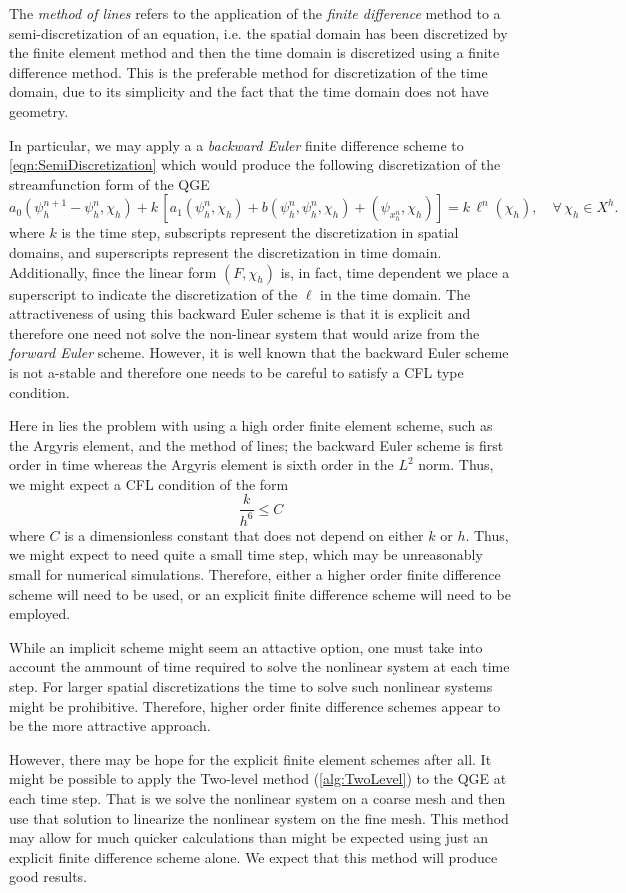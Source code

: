 The \emph{method of lines} refers to the application of the \emph{finite
difference} method to a semi-discretization of an equation, i.e. the spatial
domain has been discretized by the finite element method and then the time
domain is discretized using a finite difference method. This is the preferable
method for discretization of the time domain, due to its simplicity and the fact
that the time domain does not have geometry.

In particular, we may apply a a \emph{backward Euler} finite difference scheme
to \eqref{eqn:SemiDiscretization} which would produce the following
discretization of the streamfunction form of the QGE
\begin{equation}
  a_0(\psi_h^{n+1} - \psi_h^n, \chi_h) + k\, \left[a_1(\psi_h^n,\chi_h) + b(\psi_h^n,\psi_h^n,\chi_h)
      + (\psi_x_h^n,\chi_h)\right] = k\, \ell^n(\chi_h),\quad \forall \, \chi_h \in X^h.
  \label{eqn:BEQGE}
\end{equation}
where $k$ is the time step, subscripts represent the discretization in spatial
domains, and superscripts represent the discretization in time domain.
Additionally, fince the linear form $(F,\chi_h)$ is, in fact, time dependent
we place a superscript to indicate the discretization of the $\ell$ in the time
domain.  The attractiveness of using this backward Euler scheme is that it is
explicit and therefore one need not solve the non-linear system that would arize
from the \emph{forward Euler} scheme. However, it is well known that the
backward Euler scheme is not a-stable and therefore one needs to be careful to
satisfy a CFL type condition.

Here in lies the problem with using a high order finite element scheme, such as
the Argyris element, and the method of lines; the backward Euler scheme is first
order in time whereas the Argyris element is sixth order in the $L^2$ norm.
Thus, we might expect a CFL condition of the form
\begin{equation*}
  \frac{k}{h^6} \le C
\end{equation*}
where $C$ is a dimensionless constant that does not depend on either $k$ or $h$.
Thus, we might expect to need quite a small time step, which may be unreasonably
small for numerical simulations.  Therefore, either a higher order finite
difference scheme will need to be used, or an explicit finite difference scheme
will need to be employed.

While an implicit scheme might seem an attactive option, one must take into
account the ammount of time required to solve the nonlinear system at each time
step. For larger spatial discretizations the time to solve such nonlinear
systems might be prohibitive. Therefore, higher order finite difference schemes
appear to be the more attractive approach.

However, there may be hope for the explicit finite element schemes after all. It
might be possible to apply the Two-level method (\autoref{alg:TwoLevel}) to the
QGE at each time step. That is we solve the nonlinear system on a coarse mesh
and then use that solution to linearize the nonlinear system on the fine mesh.
This method may allow for much quicker calculations than might be expected using
just an explicit finite difference scheme alone. We expect that this method will
produce good results.
